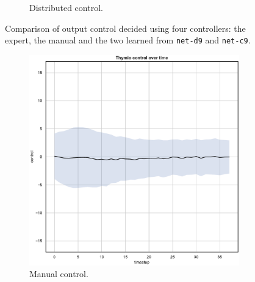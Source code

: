 \begin{figure}[!htb]
\begin{center}
\begin{subfigure}[h]{0.35\textwidth}
			\caption{Distributed control.}
		\end{subfigure}
	\end{center}
	\caption[Evaluation of the control decided by \texttt{net-c9}.]{Comparison of 
		output control decided using four controllers: the expert, the manual and the 
		two learned from \texttt{net-d9} and \texttt{net-c9}.}
\end{figure}
\medskip
\begin{figure}[!htb]\ContinuedFloat
	\begin{center}
		\begin{subfigure}[h]{0.35\textwidth}			
			\includegraphics[width=\textwidth]{contents/images/net-d9/control-overtime-manual}%
			\caption{Manual control.}
		\end{subfigure}
		\hspace{1cm}
		\begin{subfigure}[h]{0.35\textwidth}

\end{subfigure}
\end{center}
\end{figure}
